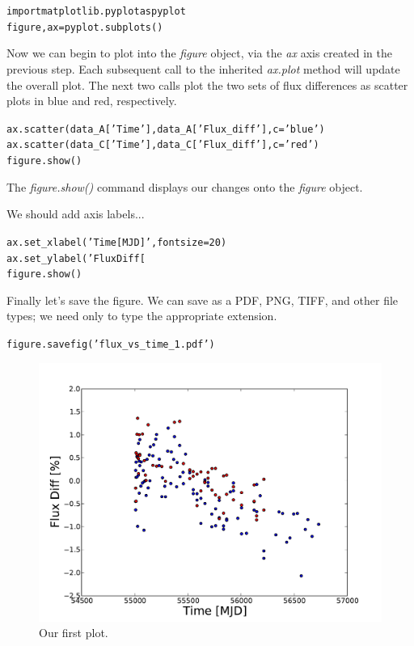 \begin{alltt}
\pytab import matplotlib.pyplot as pyplot
\pytab figure, ax = pyplot.subplots()
\end{alltt}

Now we can begin to plot into the \textit{figure} object, via the \textit{ax} 
axis created in the previous step. Each subsequent call to the inherited 
\textit{ax.plot} method will update the overall plot. The next two calls
plot the two sets of flux differences as scatter plots in blue and red,
respectively.

\begin{alltt}
\pytab ax.scatter(data_A['Time'], data_A['Flux_diff'], c='blue')
\pytab ax.scatter(data_C['Time'], data_C['Flux_diff'], c='red')
\pytab figure.show()
\end{alltt}

The \textit{figure.show()} command displays our changes onto the \textit{figure}
object.

We should add axis labels...

\begin{alltt}
\pytab ax.set_xlabel('Time [MJD]', fontsize=20)
\pytab ax.set_ylabel('Flux Diff [%
\pytab figure.show()
\end{alltt}

Finally let's save the figure. We can save as a PDF, PNG, TIFF, and
other file types; we need only to type the appropriate extension.

\begin{alltt}
\pytab figure.savefig('flux_vs_time_1.pdf')
\end{alltt}


\begin{figure}[tbp]
  \centering
    \includegraphics[scale=0.55]{flux_vs_time_1.pdf}
    \caption{Our first plot.}
  \label{fig:flux_vs_time_1}
\end{figure}

